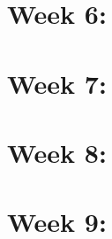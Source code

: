 \documentclass{article}
\begin{document}
\centering
\section*{Week 6: \titlesix}

\pagebreak

\centering
\section*{Week 7: \titleseven}

\pagebreak

\centering
\section*{Week 8: \titleeight}

\pagebreak

\centering
\section*{Week 9: \titlenine}

\pagebreak
\end{document}
